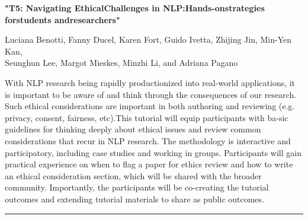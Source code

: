 \begin{center}
    \Large{\textbf{"T5: Navigating EthicalChallenges in NLP:Hands-onstrategies forstudents andresearchers"}\\}
    \par\bigskip
    \large{Luciana Benotti, Fanny Ducel, Karen Fort, Guido Ivetta, Zhijing Jin, Min-Yen Kan, \\
Seunghun Lee, Margot Mieskes, Minzhi Li, and Adriana Pagano}\\
    \par\bigskip

\end{center}

With NLP research being rapidly productionized into real-world applications, it is important to be aware of and think through the consequences of our research. Such ethical considerations are important in both authoring and reviewing (e.g. privacy, consent, fairness, etc).This tutorial will equip participants with ba-sic guidelines for thinking deeply about ethical issues and review common considerations that recur in NLP research. The methodology is interactive and participatory, including case studies and working in groups. Participants will gain practical experience on when to flag a paper for ethics review and how to write an ethical consideration section, which will be shared with the broader community. Importantly, the participants will be co-creating the tutorial outcomes and extending tutorial materials to share as public outcomes.

\begin{center}
    \noindent\rule{200px}{1pt}
\end{center}
